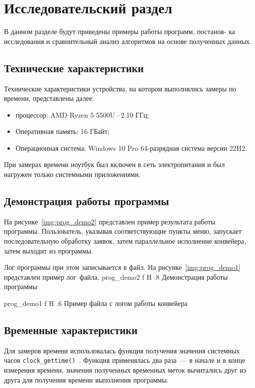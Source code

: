 \chapter{Исследовательский раздел}
В данном разделе будут приведены примеры работы программ, постанов-
ка исследования и сравнительный анализ алгоритмов на основе полученных данных.

\section{Технические характеристики}
Технические характеристики устройства, на котором выполнялись замеры по времени, представлены далее.
\begin{itemize}
	\item процессор: AMD Ryzen 5 5500U\,--\,2.10 ГГц;
	\item Оперативная память: 16 ГБайт;
	\item Операционная система: Windows 10 Pro 64-разрядная система версии 22H2.
\end{itemize}

При замерах времени ноутбук был включен в сеть электропитания и был нагружен только системными приложениями.

\section{Демонстрация работы программы}
На рисунке~\ref{img:prog_demo2} представлен пример результата работы программы. 
Пользователь, указывая соответствующие пункты меню, запускает последовательную обработку заявок, затем параллельное исполнение конвейера, затем выходит из программы. 

Лог программы при этом записывается в файл. 
На рисунке~\ref{img:prog_demo1} представлен пример лог–файла.
{prog_demo2}
{f}
{H}
{.8\textwidth}
{Демонстрация работы программы}

{prog_demo1}
{f}
{H}
{.6\textwidth}
{Пример файла с логом работы конвейера}

\section{Временные характеристики}
Для замеров времени использовалась функция получения значения системных часов \texttt{clock\_gettime()}~\cite{cpp-ctime}. 
Функция применялась два раза~--- в начале и в конце измерения времени, значения полученных временных меток вычитались друг из друга для получения времени выполнения программы.

